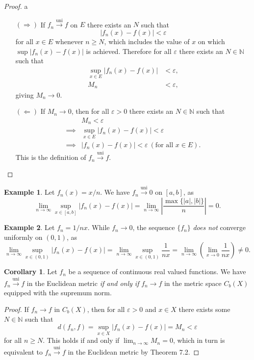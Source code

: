\documentclass{article}
\newcommand{\N}{\mathbb{N}}
\newcommand{\uni}{\overset{\text{uni}}{\to}}
\theoremstyle{definition}
\newtheorem{corollary}{Corollary}[section]
\newtheorem{example}{Example}[section]
\begin{document}
	\begin{proof}{\color{white}a}
		\begin{enumerate}
			\item [$ (\Longrightarrow) $] If $ f_n\uni f $ on $E$ there exists an $ N $ such that $$ |f_n(x)-f(x)|<\varepsilon$$ for all $ x\in E $ whenever $ n\ge N $, which includes the value of $ x $ on which $\sup |f_n(x)-f(x)| $ is achieved. Therefore for all $ \varepsilon $ there exists an $ N\in\N $ such that
			\begin{align*}
				\sup_{x\in E}|f_n(x)-f(x)|&<\varepsilon,\\M_n&<\varepsilon,
			\end{align*}
			giving $ M_n\to 0 $. 
			\item [$ (\Longleftarrow) $]  If $ M_n\to 0 $, then for all $ \varepsilon>0 $ there exists an $ N\in\N $ such that \begin{align*}
				&M_n<\varepsilon\\\implies&\sup_{x\in E}|f_n(x)-f(x)|<\varepsilon\\\implies& |f_n(x)-f(x)|<\varepsilon\ (\text{for all }x\in E).
			\end{align*} 
			This is the definition of $ f_n\uni f $. 
		\end{enumerate}
	\end{proof}
	\begin{example}
		Let $ f_n(x)=x/n $. We have $ f_n\uni 0 $ on $ [a,b] $, as $$ \lim\limits_{n\to\infty}\sup_{x\in [a,b]}|f_n(x)-f(x)|=\lim\limits_{n\to\infty}\left\lvert\frac{\max\{|a|,|b|\}}{n}\right\rvert=0.$$
	\end{example}
	\begin{example}
		Let $ f_n=1/nx $. While $ f_n\to 0 $, the sequence $ \{f_n\} $ \textit{does not} converge uniformly on $ (0,1) $, as $$ \lim\limits_{n\to\infty}\sup_{x\in (0,1)}|f_n(x)-f(x)|=\lim\limits_{n\to\infty}\sup_{x\in (0,1)}\frac{1}{nx}= \lim\limits_{n\to\infty}\left(\lim\limits_{x\to0}\frac{1}{nx}\right)\neq 0.$$
	\end{example}
	\begin{corollary}
		Let $ f_n $ be a sequence of continuous real valued functions. We have $ f_n\uni f $ in the Euclidean metric \textit{if and only if} $ f_n\to f $ in the metric space $ C_b(X) $ equipped with the supremum norm.
	\end{corollary}
	\begin{proof}
		If $ f_n\to f $ in $ C_b(X) $, then for all $ \varepsilon>0 $ and $ x\in X $ there exists some $ N\in\N $ such that $$ d(f_n,f)=\sup_{x\in X}|f_n(x)-f(x)|=M_n<\varepsilon$$ for all $ n\ge N $. This holds if and only if $ \lim_{n\to\infty}M_n=0 $, which in turn is equivalent to $ f_n\uni f $ in the Euclidean metric by Theorem 7.2.
	\end{proof}
\end{document}
